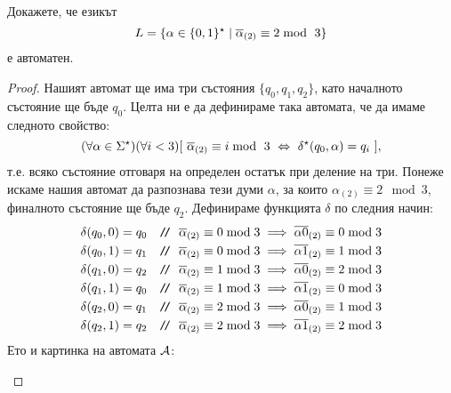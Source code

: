\begin{problem}
  Докажете, че езикът
  \[L = \{\alpha \in \{0,1\}^\star \mid \overline{\alpha}_{(2)} \equiv 2 \bmod\ 3\}\]
  е автоматен.
\end{problem}
\begin{proof}
  Нашият автомат ще има три състояния $\{q_0,q_1,q_2\}$, като началното състояние ще бъде $q_0$.
  Целта ни е да дефинираме така автомата, че да имаме следното свойство:
  \begin{equation}
    (\forall\alpha\in\Sigma^\star)(\forall i < 3)[\ \ov{\alpha}_{(2)} \equiv i \bmod\ 3\ \Leftrightarrow\ \delta^\star(q_0,\alpha) = q_i\ ],
  \end{equation}
  т.е. всяко състояние отговаря на определен остатък при деление на три.
  Понеже искаме нашия автомат да разпознава тези думи $\alpha$,
  за които $\alpha_{(2)} \equiv 2\mod 3$, финалното състояние ще бъде $q_2$.
  Дефинираме функцията $\delta$ по следния начин:
  \begin{align*}
    & \delta(q_0,0) = q_0 & \texttt{/}\!\texttt{/}\ {\ \overline{\alpha}_{(2)} \equiv 0 \bmod 3 \implies \overline{\alpha 0}_{(2)} \equiv 0 \bmod 3 }\\
    & \delta(q_0,1) = q_1 & \texttt{/}\!\texttt{/}\ {\ \overline{\alpha}_{(2)} \equiv 0 \bmod 3 \implies \overline{\alpha 1}_{(2)} \equiv 1 \bmod 3 }\\
    & \delta(q_1,0) = q_2 & \texttt{/}\!\texttt{/}\ {\ \overline{\alpha}_{(2)} \equiv 1 \bmod 3 \implies \overline{\alpha 0}_{(2)} \equiv 2 \bmod 3 }\\
    & \delta(q_1,1) = q_0 & \texttt{/}\!\texttt{/}\ {\ \overline{\alpha}_{(2)} \equiv 1 \bmod 3 \implies \overline{\alpha 1}_{(2)} \equiv 0 \bmod 3 }\\
    & \delta(q_2,0) = q_1 & \texttt{/}\!\texttt{/}\ {\ \overline{\alpha}_{(2)} \equiv 2 \bmod 3 \implies \overline{\alpha 0}_{(2)} \equiv 1 \bmod 3 }\\
    & \delta(q_2,1) = q_2 & \texttt{/}\!\texttt{/}\ {\ \overline{\alpha}_{(2)} \equiv 2 \bmod 3 \implies \overline{\alpha 1}_{(2)} \equiv 2 \bmod 3 }
  \end{align*}
  Ето и картинка на автомата $\mathcal{A}$:
  \begin{framed}
  \begin{figure}[H]
    \begin{center}
\end{center}
\end{figure}
\end{framed}
\end{proof}
